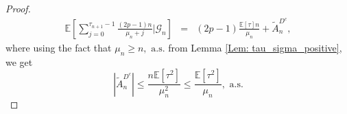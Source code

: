 \documentclass{article}
\numberwithin{equation}{section}
\newcommand{\GG}{\mbox{${\mathcal G}$}}
\newcommand{\1}{\mathbf{1}}
\newcommand{\0}{\mathbf{0}}
\newcommand{\PP}{\mbox{${\mathbb P}$}}
\newcommand{\E}{\mbox{${\mathbb E}$}}
\begin{document}
\begin{proof}
\begin{eqnarray} 
\label{Eq: Bound_term_first}
\E\left[\sum_{j=0}^{\tau_{n+1}-1} \frac{(2p-1)n}{\mu_n+j} \Big\vert \GG_n\right]
   &=& (2p-1)\frac{\E[\tau]n}{\mu_n} + \tilde{A}_n^{D^c},
\end{eqnarray}
where using the fact that $\mu_n \ge n, \text{ a.s.}$ from Lemma \ref{Lem: tau_sigma_positive}, we get 
\begin{equation}
\label{Eq: bound_on_A_tilde_c}
|\tilde{A}_n^{D^c}|\le \frac{n \E \left[\tau^2\right]}{\mu^2_n} \le \frac{\E \left[\tau^2\right]}{\mu_n}, \text{ a.s.}
\end{equation}

\end{proof}
\end{document}
